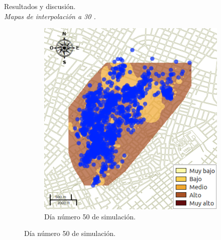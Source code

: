 \begin{frame}[t]{Resultados y discusión.\\\textit{Mapas de interpolación a 30 \textcelsius.}}
\begin{figure}
\begin{subfigure}[b]{0.45\textwidth}
        \includegraphics[width=\textwidth]{../book/capitulo-6/graphics/raster/temp-30-35.png}
        \caption{Día número 50 de simulación.}
    \end{subfigure}
    \end{figure}
\end{frame}
